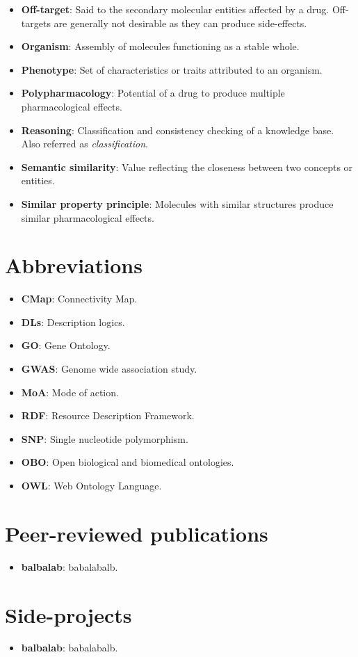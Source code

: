 \begin{itemize}
  \item \textbf{Off-target}: Said to the secondary molecular entities affected by a drug. Off-targets are generally not desirable as they can produce side-effects.
  \item \textbf{Organism}: Assembly of molecules functioning as a stable whole.
  \item \textbf{Phenotype}: Set of characteristics or traits attributed to an organism.
  \item \textbf{Polypharmacology}: Potential of a drug to produce multiple pharmacological effects.
  \item \textbf{Reasoning}: Classification and consistency checking of a knowledge base. Also referred as \emph{classification}.
  \item \textbf{Semantic similarity}: Value reflecting the closeness between two concepts or entities.
  \item \textbf{Similar property principle}: Molecules with similar structures produce similar pharmacological effects.
\end{itemize}

\chapter{Abbreviations}
\begin{itemize}
  \item \textbf{CMap}: Connectivity Map.
  \item \textbf{DLs}: Description logics.
  \item \textbf{GO}: Gene Ontology.
  \item \textbf{GWAS}: Genome wide association study.
  \item \textbf{MoA}: Mode of action.
  \item \textbf{RDF}: Resource Description Framework.
  \item \textbf{SNP}: Single nucleotide polymorphism.
  \item \textbf{OBO}: Open biological and biomedical ontologies.
  \item \textbf{OWL}: Web Ontology Language.
\end{itemize}

\chapter{Peer-reviewed publications}
\begin{itemize}
  \item \textbf{balbalab}: babalabalb.
\end{itemize}

\chapter{Side-projects}
\begin{itemize}
  \item \textbf{balbalab}: babalabalb.
\end{itemize}
